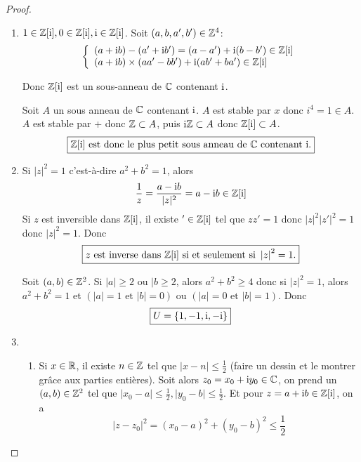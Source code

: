 \begin{proof}
	\phantom{}
	\begin{enumerate}
		\item $1\in\mathbb{Z}[\mathrm{i}],0\in\mathbb{Z}[\mathrm{i}],\mathrm{i}\in\mathbb{Z}[\mathrm{i}]$. Soit $(a,b,a',b')\in\mathbb{Z}^{4}$:
		\begin{equation}
			\left\{
				\begin{array}[]{l}
					(a+\i b)-(a'+\i b')=(a-a')+\i(b-b')\in\Z[\i]\\
					(a+\i b)\times (aa'-bb')+\i(ab'+ba')\in\Z[\i]
				\end{array}
			\right.
		\end{equation}
		
		Donc $\mathbb{Z}[\mathrm{i}]$ est un sous-anneau de $\mathbb{C}$ contenant $\mathrm{i}$.

		Soit $A$ un sous anneau de $\mathbb{C}$ contenant $\mathrm{i}$. $A$ est stable par $x$ donc $i^{4}=1\in A$. $A$ est stable par + donc $\mathbb{Z}\subset A$, puis $\mathrm{i}\mathbb{Z}\subset A$ donc $\mathbb{Z}[\mathrm{i}]\subset A$. 
		\begin{equation}
			\boxed{\mathbb{Z}[\mathrm{i}]\text{ est donc le plus petit sous anneau de }\mathbb{C}\text{ contenant }\mathrm{i}.}
		\end{equation}

		\item Si $\vert z\vert^{2}=1$ c'est-à-dire $a^{2}+b^{2}=1$, alors 
		\begin{equation}
			\frac{1}{z}=\frac{a-\mathrm{i} b}{\vert z\vert^{2}}=a-\mathrm{i} b\in\mathbb{Z}[\mathrm{i}]
		\end{equation}
		Si $z$ est inversible dans $\mathbb{Z}[\mathrm{i}]$, il existe $'\in\mathbb{Z}[\mathrm{i}]$ tel que $zz'=1$ donc $\vert z\vert^{2}\vert z'\vert^{2}=1$ donc $\vert z\vert^{2}=1$. Donc 
		\begin{equation}
			\boxed{z\text{ est inverse dans }\mathbb{Z}[\mathrm{i}]\text{ si et seulement si }\left\lvert z\right\rvert^{2}=1.}
		\end{equation}

		Soit $(a,b)\in\mathbb{Z}^{2}$. Si $\vert a\vert\geqslant2$ ou $\vert b\geqslant2$, alors $a^{2}+b^{2}\geqslant4$ donc si $\vert z\vert^{2}=1$, alors $a^{2}+b^{2}=1$ et $\left(\vert a\vert=1\text{ et }\vert b\vert=0\right)$ ou $\left(\vert a\vert=0\text{ et }\vert b\vert=1\right)$. Donc 
		\begin{equation}
			\boxed{U=\left\{1,-1,\mathrm{i},-\mathrm{i}\right\}}
		\end{equation}

		\item 
		\begin{enumerate}
			\item Si $x\in\mathbb{R}$, il existe $n\in\mathbb{Z}$ tel que $\vert x-n\vert\leqslant\frac{1}{2}$ (faire un dessin et le montrer grâce aux parties entières). Soit alors $z_{0}=x_{0}+\mathrm{i} y_{0}\in\mathbb{C}$, on prend un $(a,b)\in\mathbb{Z}^{2}$ tel que $\vert x_{0}-a\vert\leqslant\frac{1}{2},\vert y_{0}-b\vert\leqslant\frac{1}{2}$. Et pour $z=a+\mathrm{i} b\in\mathbb{Z}[\mathrm{i}]$, on a 
			\begin{equation}
				\boxed{\vert z-z_{0}\vert^{2}=(x_{0}-a)^{2}+(y_{0}-b)^{2}\leqslant\frac{1}{2}}
			\end{equation}
			

\end{enumerate}
\end{enumerate}
\end{proof}
